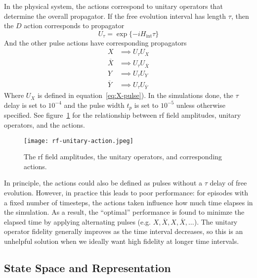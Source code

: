 In the physical system, the actions correspond to unitary operators that determine the overall propagator. If the free evolution interval has length $\tau$, then the $D$ action corresponds to propagator
\[
U_{\tau} = \exp\{ -i H_{\text{int}} \tau \}
\]
And the other pulse actions have corresponding propagators
\begin{align*}
    X &\implies U_{\tau} U_X \\
    \overline{X} &\implies U_{\tau} U_{\overline{X}} \\
    Y & \implies U_{\tau} U_Y \\
    \overline{Y} &\implies U_{\tau} U_{\overline{Y}}
\end{align*}
Where $U_X$ is defined in equation~\ref{eq:X-pulse}). In the simulations done, the $\tau$ delay is set to $10^{-4}$ and the pulse width $t_p$ is set to $10^{-5}$ unless otherwise specified.
See figure~\ref{fig:actions} for the relationship between rf field amplitudes, unitary operators, and the actions.

\begin{figure}[H]
    \centering
    \texttt{[image: rf-unitary-action.jpeg]}
    \caption{The rf field amplitudes, the unitary operators, and corresponding actions.}
    \label{fig:actions}
\end{figure}

In principle, the actions could also be defined as pulses without a $\tau$ delay of free evolution. However, in practice this leads to poor performance: for episodes with a fixed number of timesteps, the actions taken influence how much time elapses in the simulation. As a result, the ``optimal'' performance is found to minimze the elapsed time by applying alternating pulses (e.g. $X, \overline{X}, X, \overline{X}, \dots$).
The unitary operator fidelity generally improves as the time interval decreases, so this is an unhelpful solution when we ideally want high fidelity at longer time intervals.

\subsection{State Space and Representation}

